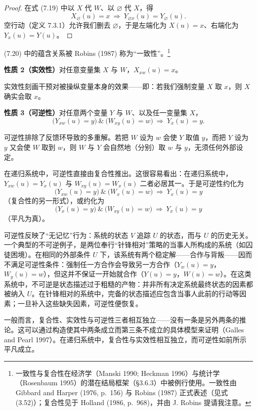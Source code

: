 \begin{proof}
在式 \textup{(7.19)} 中以 $X$ 代 $W$、以 $\varnothing$ 代 $X$，得
\[
X_\varnothing(u)=x\ \Longrightarrow\ Y_{\varnothing x}(u)=Y_\varnothing(u).
\]
空行动（定义 7.3.1）允许我们删去 $\varnothing$，于是左端化为 $X(u)=x$、右端化为 $Y_x(u)=Y(u)$。
\end{proof}

\textup{(7.20)} 中的蕴含关系被 Robins (1987) 称为“一致性”。\footnote{一致性与复合性在经济学（Manski 1990; Heckman 1996）与统计学（Rosenbaum 1995）的潜在结局框架（\S 3.6.3）中被例行使用。一致性由 Gibbard and Harper (1976, p.~156) 与 Robins (1987) 正式表述（见式 \textup{(3.52)}）；复合性见于 Holland (1986, p.~968)，并由 J. Robins 提请我注意。}

\medskip
\noindent\textbf{性质 2（实效性）}\quad 对任意变量集 $X$ 与 $W$，$X_{xw}(u)=x$。

实效性刻画干预对被操纵变量本身的效果——即：若我们强制变量 $X$ 取 $x$，则 $X$ 确实会取 $x$。

\medskip
\noindent\textbf{性质 3（可逆性）}\quad 对任意两个变量 $Y$ 与 $W$、以及任一变量集 $X$，
\begin{equation}
\bigl(Y_{xw}(u)=y\bigr)\ \&\ \bigl(W_{xy}(u)=w\bigr)\ \Longrightarrow\ Y_x(u)=y. \tag{7.21}
\end{equation}

可逆性排除了反馈环导致的多重解。若把 $W$ 设为 $w$ 会使 $Y$ 取值 $y$，而把 $Y$ 设为 $y$ 又会使 $W$ 取到 $w$，则 $W$ 与 $Y$ 会自然地（分别）取 $w$ 与 $y$，无须任何外部设定。

在递归系统中，可逆性直接由复合性推出。这很容易看出：在递归系统中，$Y_{xw}(u)=Y_x(u)$ 与 $W_{xy}(u)=W_x(u)$ 二者必居其一。于是可逆性约化为
\[
\bigl(Y_{xw}(u)=y\bigr)\ \&\ \bigl(W_x(u)=w\bigr)\ \Longrightarrow\ Y_x(u)=y
\]
（复合性的另一形式），或约化为
\[
\bigl(Y_x(u)=y\bigr)\ \&\ \bigl(W_{xy}(u)=w\bigr)\ \Longrightarrow\ Y_x(u)=y
\]
（平凡为真）。

可逆性反映了“无记忆”行为：系统的状态 $V$ 追踪 $U$ 的状态，而与 $U$ 的历史无关。一个典型的不可逆例子，是两位奉行“针锋相对”策略的当事人所构成的系统（如囚徒困境）。在相同的外部条件 $U$ 下，该系统有两个稳定解——合作与背叛——因而不满足可逆性条件：强制任一方合作会导致另一方合作（$Y_w(u)=y$，$W_y(u)=w$），但这并不保证一开始就合作（$Y(u)=y$，$W(u)=w$）。在这类系统中，不可逆是状态描述过于粗糙的产物：并非所有决定系统最终状态的因素都被纳入 $U$。在针锋相对的系统中，完备的状态描述应包含当事人此前的行动等因素；一旦补入这些缺失因素，可逆性便恢复。

一般而言，复合性、实效性与可逆性三者相互独立——没有一条是另外两条的推论。这可以通过构造使其中两条成立而第三条不成立的具体模型来证明（Galles and Pearl 1997）。在递归系统中，复合性与实效性相互独立，而可逆性如前所示平凡成立。

